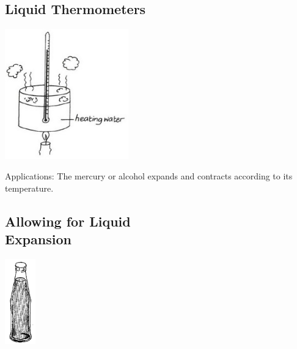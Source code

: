 \begin{multicols}{2}
\subsection{Liquid Thermometers} 

\begin{center}
\includegraphics[width=0.4\textwidth]{./img/vso/liquid-thermometers.jpg}
\end{center}

\begin{description*}
\item[Applications:]{The mercury or alcohol expands and contracts according to its temperature.}
\end{description*}

\subsection[Allowing for Liquid Expansion]{Allowing for Liquid \hfill \\ Expansion}

\begin{center}
\includegraphics[width=0.1\textwidth]{./img/source/allowing-expansion-liquid.png}
\end{center}


\end{multicols}
